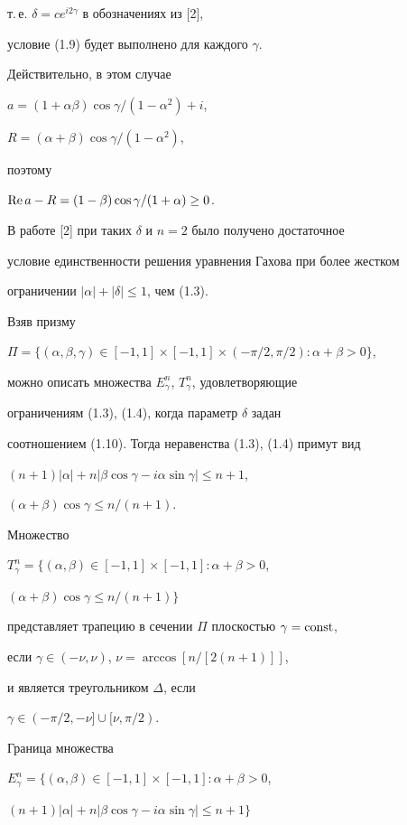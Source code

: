 т.\,е. $\delta=c e^{i2\gamma}$ в обозначениях из [2], 


условие (1.9) будет выполнено для каждого $\gamma$.


Действительно, в этом случае


$a=(1+\alpha\beta)\cos\gamma/(1-\alpha^2)+i$,


$R=(\alpha+\beta)\cos\gamma/(1-\alpha^2)$,


поэтому


$\operatorname{Re} a-R=(1-\beta)\cos\gamma/(1+\alpha)\ge0$.


В работе [2] при таких $\delta$ и $n=2$ было получено достаточное


условие единственности решения уравнения Гахова при более жестком


ограничении $|\alpha|+|\delta|\le1$, чем (1.3).





Взяв призму


$\Pi=\{(\alpha,\beta,\gamma)\in[-1,1]\times[-1,1]\times


(-\pi/2,\pi/2): \alpha+\beta>0\}$,


можно описать множества $E_\gamma^n$, $T_\gamma^n$, удовлетворяющие


ограничениям (1.3), (1.4), когда параметр $\delta$ задан


соотношением (1.10). Тогда неравенства (1.3), (1.4) примут вид


$(n+1)|\alpha|+n|\beta\cos\gamma-i\alpha\sin\gamma|\le n+1$,


$(\alpha+\beta)\cos\gamma\le n/(n+1)$.


Множество


$T_\gamma^n=\big\{(\alpha,\beta)\in[-1,1]\times[-1,1]: \alpha+\beta>0$,


$(\alpha+\beta)\cos\gamma\le n/(n+1)\big\}$


представляет трапецию в сечении $\Pi$ плоскостью $\gamma=\operatorname{const}$,


если $\gamma\in (-\nu, \nu)$, $\nu = \arccos[ n/[2(n+1)]]$,


и является треугольником $\Delta$, если


$\gamma\in(-\pi/2,-\nu]\cup[\nu,\pi/2)$.


Граница множества


$E_\gamma^n=\{(\alpha,\beta)\in[-1,1]\times[-1,1]: \alpha+\beta>0$,


$(n+1)|\alpha|+n|\beta\cos\gamma-


i\alpha\sin\gamma|\le n+1\}$


